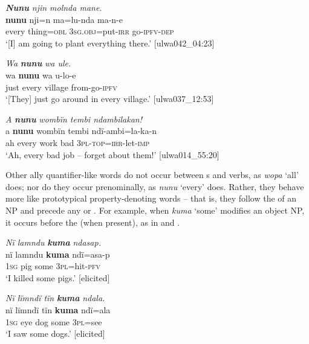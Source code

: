 \ea%
    \label{ex:det:185}
          \textbf{\textit{Nunu}} \textit{njin molnda mane.}\\
\gll    \textbf{nunu}  nji=n    ma=lu{}-nda      ma-n-e\\
    every  thing=\textsc{obl}  \textsc{3sg.obj}=put-\textsc{irr}  go-\textsc{ipfv-dep}\\
\glt `[I] am going to plant everything there.’ [ulwa042\_04:23]
\z

\ea%
    \label{ex:det:186}
          \textit{Wa} \textbf{\textit{nunu}} \textit{wa ule.}\\
\gll    wa    \textbf{nunu}  wa    u-lo-e\\
    just    every  village  from-go-\textsc{ipfv}\\
\glt `[They] just go around in every village.’ [ulwa037\_12:53]
\z

\ea%
    \label{ex:det:187}
          \textit{A} \textbf{\textit{nunu}} \textit{wombïn tembi ndambilakan!}\\
\gll    a  \textbf{nunu}  wombïn  tembi  ndï-ambi=la-ka-n\\
    ah  every  work    bad    \textsc{3pl-top}=\textsc{irr-}let-\textsc{imp}\\
\glt `Ah, every bad job -- forget about them!’ [ulwa014\_55:20]
\z

Other ally quantifier-like words do not occur between s and verbs, as \textit{wopa} ‘all’ does; nor do they occur prenominally, as \textit{nunu} ‘every’ does. Rather, they behave more like prototypical property-denoting words -- that is, they follow the  of an NP and precede any  or . For example, when \textit{kuma} ‘some’ modifies an object NP, it occurs before the  (when present), as in  and .


\ea%
    \label{ex:det:188}
          \textit{Nï lamndu} \textbf{\textit{kuma}} \textit{ndasap.}\\
\gll    nï    lamndu  \textbf{kuma}  ndï=asa-p\\
    \textsc{1sg}  pig      some  \textsc{3pl}=hit-\textsc{pfv}\\
\glt `I killed some pigs.’ [elicited]
\z

\ea%
    \label{ex:det:189}
          \textit{Nï lïmndï tïn} \textbf{\textit{kuma}} \textit{ndala.}\\
\gll    nï    lïmndï  tïn    \textbf{kuma}  ndï=ala\\
    \textsc{1sg}  eye    dog  some  \textsc{3pl}=see\\
\glt `I saw some dogs.’ [elicited]
\z

